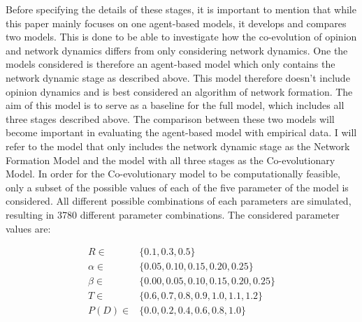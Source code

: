 \documentclass{article}
\begin{document}
Before specifying the details of these stages, it is important to mention that while this paper mainly focuses on one agent-based models, it develops and compares two models. This is done to be able to investigate how the co-evolution of opinion and network dynamics differs from only considering network dynamics. 
One the models considered is therefore an agent-based model which only contains the network dynamic stage as described above. This model therefore doesn't include opinion dynamics and is best considered an algorithm of network formation. The aim of this model is to serve as a baseline for the full model, which includes all three stages described above. The comparison between these two models will become important in evaluating the agent-based model with empirical data. I will refer to the model that only includes the network dynamic stage as the Network Formation Model and the model with all three stages as the Co-evolutionary Model.
In order for the Co-evolutionary model to be computationally feasible, only a subset of the possible values of each of the five parameter of the model is considered. All different possible combinations of each parameters are simulated, resulting in 3780 different parameter combinations. The considered parameter values are:


\begin{align*}
    R \in & \{0.1, 0.3, 0.5\} \\
    \alpha \in & \{0.05, 0.10, 0.15, 0.20, 0.25\} \\
    \beta \in & \{0.00, 0.05, 0.10, 0.15, 0.20, 0.25\}\\
    T \in & \{0.6, 0.7, 0.8, 0.9, 1.0, 1.1, 1.2\}\\
    P(D) \in & \{0.0, 0.2, 0.4, 0.6, 0.8, 1.0\}\\
\end{align*}
\end{document}
